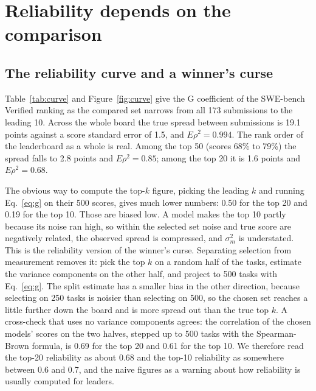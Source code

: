 \documentclass[11pt]{article}
\begin{document}
\section{Reliability depends on the comparison}

\subsection{The reliability curve and a winner's curse}

Table~\ref{tab:curve} and Figure~\ref{fig:curve} give the G coefficient of the SWE-bench Verified ranking as the compared set narrows from all 173 submissions to the leading 10. Across the whole board the true spread between submissions is 19.1 points against a score standard error of 1.5, and $E\rho^2 = 0.994$. The rank order of the leaderboard as a whole is real. Among the top 50 (scores 68\% to 79\%) the spread falls to 2.8 points and $E\rho^2 = 0.85$; among the top 20 it is 1.6 points and $E\rho^2 = 0.68$.

The obvious way to compute the top-$k$ figure, picking the leading $k$ and running Eq.~\ref{eq:g} on their 500 scores, gives much lower numbers: 0.50 for the top 20 and 0.19 for the top 10. Those are biased low. A model makes the top 10 partly because its noise ran high, so within the selected set noise and true score are negatively related, the observed spread is compressed, and $\sigma^2_m$ is understated. This is the reliability version of the winner's curse. Separating selection from measurement removes it: pick the top $k$ on a random half of the tasks, estimate the variance components on the other half, and project to 500 tasks with Eq.~\ref{eq:g}. The split estimate has a smaller bias in the other direction, because selecting on 250 tasks is noisier than selecting on 500, so the chosen set reaches a little further down the board and is more spread out than the true top $k$. A cross-check that uses no variance components agrees: the correlation of the chosen models' scores on the two halves, stepped up to 500 tasks with the Spearman-Brown formula, is 0.69 for the top 20 and 0.61 for the top 10. We therefore read the top-20 reliability as about 0.68 and the top-10 reliability as somewhere between 0.6 and 0.7, and the naive figures as a warning about how reliability is usually computed for leaders.
\end{document}

